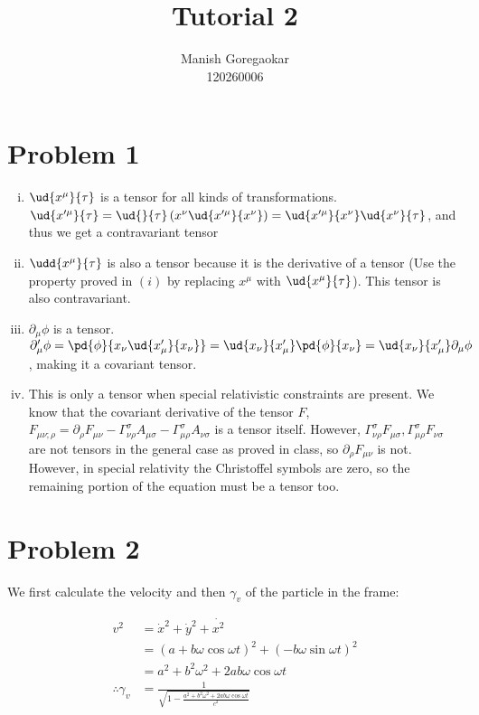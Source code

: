 \documentclass[12pt]{article}
\author{Manish Goregaokar\\120260006}
\title{Tutorial 2}
\begin{document}
\maketitle

\section*{Problem 1}
\begin{enumerate}[(i)]
\item $\ud{x^\mu}{\tau}$ is a tensor for all kinds of transformations. $\ud{x'^\mu}{\tau}=\ud{}{\tau}\left(x^\nu\ud{x'^\mu}{x^\nu}\right)=\ud{x'^\mu}{x^\nu}\ud{x^\nu}{\tau}$, and thus we get a contravariant tensor
\item $\udd{x^\mu}{\tau}$ is also a tensor because it is the derivative of a tensor (Use the property proved in $(i)$ by replacing $x^\mu$ with $\ud{x^\mu}{\tau}$). This tensor is also contravariant.
\item $\partial_\mu\phi$ is a tensor. $\partial_\mu'\phi=\pd{\phi}{ x_\nu\ud{x_\mu'}{x_\nu}}=\ud{x_\nu}{x_\mu'}\pd{\phi}{x_\nu}=\ud{x_\nu}{x_\mu'}\partial_\mu\phi$, making it a covariant tensor.
\item This is only a tensor when special relativistic constraints are present. We know that the covariant derivative of the tensor $F$, $F_{\mu\nu;\rho}=\partial_\rho F_{\mu\nu}-\Gamma_{\nu\rho}^{\sigma}A_{\mu\sigma}
-\Gamma_{\mu\rho}^{\sigma}A_{\nu\sigma}$ is a tensor itself. However, $\Gamma_{\nu\rho}^{\sigma}F_{\mu\sigma},\Gamma_{\mu\rho}^{\sigma}F_{\nu\sigma}$ are not  tensors in the general case as proved in class, so $\partial_\rho F_{\mu\nu}$ is not. However, in special relativity the Christoffel symbols are zero, so the remaining portion of the equation must be a tensor too.
\end{enumerate}
\section*{Problem 2}
We first calculate the velocity and then $\gamma_v$ of the particle in the frame:

\begin{align*}v^2&=\dot{x}^2+\dot{y}^2+\dot{x^2}\\
&=(a+b\omega\cos\omega t)^2 + (-b\omega\sin\omega t)^2\\
&= a^2 +b^2\omega^2 + 2ab\omega\cos\omega t\\
\therefore \gamma_v &= \frac{1}{\sqrt{1-\frac{a^2 +b^2\omega^2 + 2ab\omega\cos\omega t}{c^2}}}
\end{align*}
\end{document}
